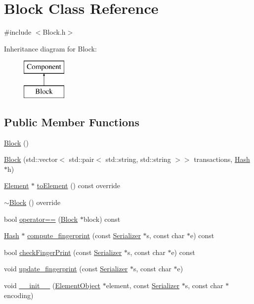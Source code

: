 \hypertarget{classBlock}{}\section{Block Class Reference}
\label{classBlock}


{\ttfamily \#include $<$Block.\+h$>$}

Inheritance diagram for Block\+:\begin{figure}[H]
\begin{center}
\leavevmode
\includegraphics[height=2.000000cm]{classBlock}
\end{center}
\end{figure}
\subsection*{Public Member Functions}
\begin{DoxyCompactItemize}
\item 
\mbox{\hyperlink{classBlock_a37658a946bf5067ad01d68d9ff086adc}{Block}} ()
\item 
\mbox{\hyperlink{classBlock_a9ce633d8b027591b12f7c3ec7a2dcad2}{Block}} (std\+::vector$<$ std\+::pair$<$ std\+::string, std\+::string $>$$>$ transactions, \mbox{\hyperlink{classHash}{Hash}} $\ast$h)
\item 
\mbox{\hyperlink{classElement}{Element}} $\ast$ \mbox{\hyperlink{classBlock_aa289363a40f0d3ba88720ad0bc71f34f}{to\+Element}} () const override
\item 
\mbox{\hyperlink{classBlock_a8e35c9089e806962b83bca4e5e288142}{$\sim$\+Block}} () override
\item 
bool \mbox{\hyperlink{classBlock_a24fef11a9eaf9b23490a734be5e30f30}{operator==}} (\mbox{\hyperlink{classBlock}{Block}} $\ast$block) const
\item 
\mbox{\hyperlink{classHash}{Hash}} $\ast$ \mbox{\hyperlink{classBlock_ab9d7e32509fb1ab4ca2bb63854f52cc3}{compute\+\_\+fingerprint}} (const \mbox{\hyperlink{classSerializer}{Serializer}} $\ast$s, const char $\ast$e) const
\item 
bool \mbox{\hyperlink{classBlock_a0755737dbbca68ee6a1ca62340843746}{check\+Finger\+Print}} (const \mbox{\hyperlink{classSerializer}{Serializer}} $\ast$s, const char $\ast$e) const
\item 
void \mbox{\hyperlink{classBlock_a94171fbe52bfc48542058749f1611228}{update\+\_\+fingerprint}} (const \mbox{\hyperlink{classSerializer}{Serializer}} $\ast$s, const char $\ast$e)
\item 
void \mbox{\hyperlink{classComponent_a28212595f8ee85fe009bd233bc99b2fc}{\+\_\+\+\_\+init\+\_\+\+\_\+}} (\mbox{\hyperlink{classElementObject}{Element\+Object}} $\ast$element, const \mbox{\hyperlink{classSerializer}{Serializer}} $\ast$s, const char $\ast$encoding)
\end{DoxyCompactItemize}
